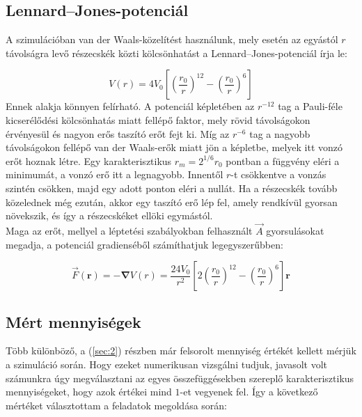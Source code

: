\begin{multicols}{2}
\subsection{Lennard--Jones-potenciál} \label{sub:3.2}
A szimulációban van der Waals-közelítést használunk, mely esetén az egyástól $r$ távolságra levő részecskék közti kölcsönhatást a Lennard--Jones-potenciál\cite{1924RSPSA.106..463J} írja le:

\begin{equation}
    V \left( r \right)
    =
    4 V_{0} \left[ \left( \frac{r_{0}}{r} \right)^{12} - \left( \frac{r_{0}}{r} \right)^{6} \right]
\end{equation}
Ennek alakja könnyen felírható. A potenciál képletében az $r^{-12}$ tag a Pauli-féle kicserélődési kölcsönhatás miatt fellépő faktor, mely rövid távolságokon érvényesül és nagyon erős taszító erőt fejt ki. Míg az $r^{-6}$ tag a nagyobb távolságokon fellépő van der Waals-erők miatt jön a képletbe, melyek itt vonzó erőt hoznak létre. Egy karakterisztikus $r_{m} = 2^{1/6} r_{0}$ pontban a függvény eléri a minimumát, a vonzó erő itt a legnagyobb. Innentől $r$-t csökkentve a vonzás szintén csökken, majd egy adott ponton eléri a nullát. Ha a részecskék tovább közelednek még ezután, akkor egy taszító erő lép fel, amely rendkívül gyorsan növekszik, és így a részecskéket ellöki egymástól. \\
Maga az erőt, mellyel a léptetési szabályokban felhasznált $\vec{A}$ gyorsulásokat megadja, a potenciál gradienséből számíthatjuk legegyszerűbben:

\begin{equation}
    \vec{F} \left( \boldsymbol{r} \right)
    =
    - \boldsymbol{\nabla} V \left( r \right)
    =
    \frac{24 V_{0}}{r^{2}} \left[ 2 \left( \frac{r_{0}}{r} \right)^{12} - \left( \frac{r_{0}}{r} \right)^{6} \right] \boldsymbol{r}
\end{equation}

\subsection{Mért mennyiségek} \label{sub:3.3}
Több különböző, a (\ref{sec:2}) részben már felsorolt mennyiség értékét kellett mérjük a szimuláció során. Hogy ezeket numerikusan vizsgálni tudjuk, javasolt volt számunkra úgy megválasztani az egyes összefüggésekben szereplő karakterisztikus mennyiségeket, hogy azok értékei mind $1$-et vegyenek fel. Így a következő mértéket választottam a feladatok megoldása során:


\end{multicols}
